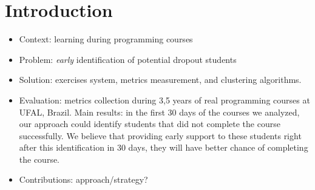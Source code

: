 \section{Introduction}

\begin{itemize}

	\item Context: learning during programming courses
	
	\item Problem: \textit{early} identification of potential dropout students
	
	\item Solution: exercises system, metrics measurement, and clustering algorithms.
	
	\item Evaluation: metrics collection during 3,5 years of real programming courses at UFAL, Brazil. Main results: in the first 30 days of the courses we analyzed, our approach could identify students that did not complete the course successfully. We believe that providing early support to these students right after this identification in 30 days, they will have better chance of completing the course.
	
	\item Contributions: approach/strategy?

\end{itemize}